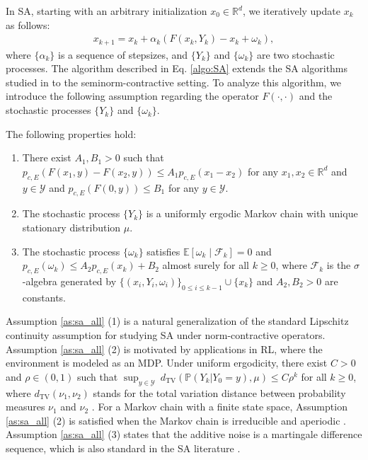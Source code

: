 \documentclass[11 pt]{article}
\begin{document}
	In SA, starting with an arbitrary initialization $x_0 \in \mathbb{R}^d$, we iteratively update $x_k$ as follows:
	\begin{align}\label{algo:SA}
		x_{k+1} = x_k + \alpha_k \left(F(x_k, Y_k) - x_k + \omega_k\right),
	\end{align}
	where $\{\alpha_k\}$ is a sequence of stepsizes, and $\{Y_k\}$ and $\{\omega_k\}$ are two stochastic processes. The algorithm described in Eq. \eqref{algo:SA} extends the SA algorithms studied in \cite{chen2021lyapunov, chandak2022concentration} to the seminorm-contractive setting. To analyze this algorithm, we introduce the following assumption regarding the operator $F(\cdot, \cdot)$ and the stochastic processes $\{Y_k\}$ and $\{\omega_k\}$.
	
	
	\begin{assumption}\label{as:sa_all}
		The following properties hold:
		\begin{enumerate}[(1)]
			\item  There exist $A_1,B_1>0$ such that $p_{c,E}(F(x_1,y)-F(x_2,y))\leq A_1p_{c,E}(x_1-x_2)$ for any $x_1,x_2\in\mathbb{R}^d$ and $y\in\mathcal{Y}$ and $p_{c,E}(F(0,y))\leq B_1$ for any $y\in\mathcal{Y}$.
			\item The stochastic process $\{Y_k\}$ is a uniformly ergodic Markov chain with unique stationary distribution $\mu$. 
			\item The stochastic process $\{\omega_k\}$ satisfies $\mathbb{E}[\omega_k \mid \mathcal{F}_k]=0$ and $p_{c,E}(\omega_k)\leq A_2p_{c,E}(x_k)+B_2$ almost surely for all $k \geq 0$, where $\mathcal{F}_k$ is the $\sigma$-algebra generated by $\{(x_i,Y_i,\omega_i)\}_{0\leq i\leq k-1}\cup \{x_k\}$ and $A_2,B_2>0$ are constants.
		\end{enumerate}
	\end{assumption}
	
	Assumption \ref{as:sa_all} (1) is a natural generalization of the standard Lipschitz continuity assumption for studying SA under norm-contractive operators. Assumption \ref{as:sa_all} (2) is motivated by applications in RL, where the environment is modeled as an MDP. Under uniform ergodicity, there exist $C > 0$ and $\rho \in (0,1)$ such that $\sup_{y\in\mathcal{Y}}~ d_{\text{TV}}\left(\mathbb{P}\left(Y_k | Y_0=y\right), \mu\right) \leq C\rho^k$ for all $k\geq 0$, where $d_{\text{TV}}\left(\nu_1, \nu_2 \right)$ stands for the total variation distance between probability measures $\nu_1$ and $\nu_2$ \cite{levin2017markov}. For a Markov chain with a finite state space, Assumption \ref{as:sa_all} (2) is satisfied when the Markov chain is irreducible and aperiodic \cite{levin2017markov}. Assumption \ref{as:sa_all} (3) states that the additive noise is a martingale difference sequence, which is also standard in the SA literature \cite{borkar2000ode}.
	
\end{document}

